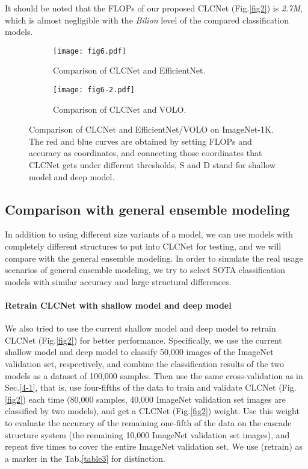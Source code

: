 \documentclass{article}
\begin{document}
It should be noted that the FLOPs of our proposed CLCNet (Fig.\ref{fig2}) is \emph{2.7M}, which is almost negligible with the \emph{Bilion} level of the compared classification models.



\begin{figure*}
  \centering
    \begin{subfigure}{0.45\textwidth}
      \centering   
      \texttt{[image: fig6.pdf]}
        \caption{Comparison of CLCNet and EfficientNet.}
        \label{fig6-1}
    \end{subfigure}         \hspace{1.5em}
    \begin{subfigure}{0.45\textwidth}
      \centering   
      \texttt{[image: fig6-2.pdf]}
        \caption{Comparison of CLCNet and VOLO.}
        \label{fig6-2}
    \end{subfigure}
\caption{Comparison of CLCNet and EfficientNet/VOLO on ImageNet-1K. The red and blue curves are obtained by setting FLOPs and accuracy as coordinates, and connecting those coordinates that CLCNet gets under different thresholds, S and D stand for shallow model and deep model.}
\label{fig6}
\end{figure*}

\subsection{Comparison with general ensemble modeling}
In addition to using different size variants of a model, we can use models with completely different structures to put into CLCNet for testing, and we will compare with the general ensemble modeling. In order to simulate the real usage scenarios of general ensemble modeling, we try to select SOTA classification models with similar accuracy and large structural differences.


\paragraph{Retrain CLCNet with shallow model and deep model}
We also tried to use the current shallow model and deep model to retrain CLCNet (Fig.\ref{fig2}) for better performance. Specifically, we use the current shallow model and deep model to classify 50,000 images of the ImageNet validation set, respectively, and combine the classification results of the two models as a dataset of 100,000 samples. Then use the same cross-validation as in Sec.\ref{4-1}, that is, use four-fifths of the data to train and validate CLCNet (Fig.\ref{fig2}) each time (80,000 samples, 40,000 ImageNet validation set images are classified by two models), and get a CLCNet (Fig.\ref{fig2}) weight. Use this weight to evaluate the accuracy of the remaining one-fifth of the data on the cascade structure system (the remaining 10,000 ImageNet validation set images), and repeat five times to cover the entire ImageNet validation set. We use (retrain) as a marker in the Tab.\ref{table3} for distinction.
\end{document}
